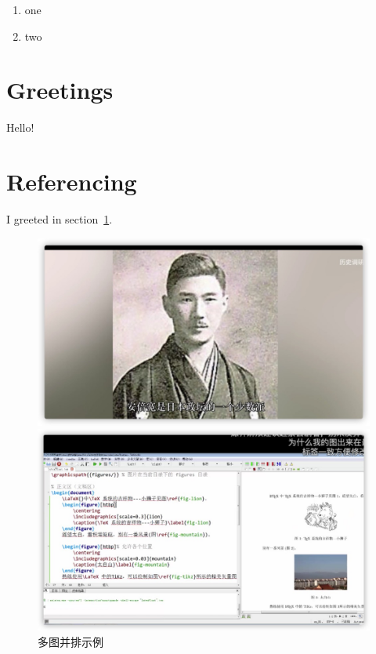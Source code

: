 \begin{enumerate}
	\item one
	\item two
\end{enumerate}
	


\section{Greetings} 
\label{sec:greetings}   Hello!   
\section{Referencing}   
I greeted in {section~\ref{sec:greetings}}.



\begin{figure}
    \centering
    \begin{minipage}[c]{0.48\textwidth}
        \centering
        \includegraphics[height=0.2\textheight]{1}
    \end{minipage}
    \begin{minipage}[c]{0.48\textwidth}
        \centering
        \includegraphics[height=0.2\textheight]{2}
    \end{minipage}
    \caption{多图并排示例}
\end{figure}




